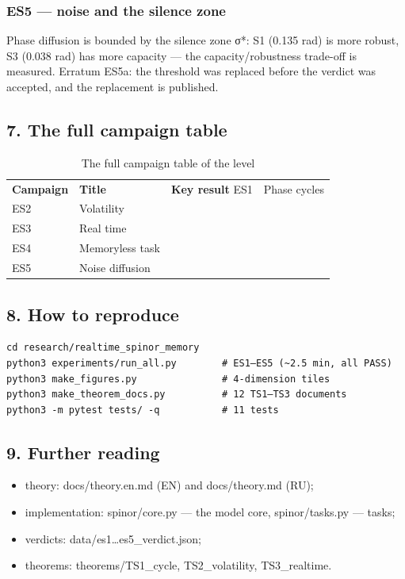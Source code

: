 \documentclass[11pt,a4paper]{article}
\begin{document}
\subsubsection{ES5 — noise and the silence zone}

Phase diffusion is bounded by the silence zone σ*: S1 (0.135 rad) is more robust, S3 (0.038 rad) has more capacity — the capacity/robustness trade-off is measured. Erratum ES5a: the threshold was replaced before the verdict was accepted, and the replacement is published.

\subsection{7. The full campaign table}

\begin{table}[htbp]\centering\small
\caption{The full campaign table of the level}
\begin{tabular}{p{} p{} p{}}
\toprule
\textbf{Campaign} & \textbf{Title} & \textbf{Key result}
\midrule
ES1 & Phase cycles &  \\
ES2 & Volatility &  \\
ES3 & Real time &  \\
ES4 & Memoryless task &  \\
ES5 & Noise diffusion &  \\
\bottomrule
\end{tabular}
\end{table}

\subsection{8. How to reproduce}

\begin{verbatim}
cd research/realtime_spinor_memory
python3 experiments/run_all.py        # ES1–ES5 (~2.5 min, all PASS)
python3 make_figures.py               # 4-dimension tiles
python3 make_theorem_docs.py          # 12 TS1–TS3 documents
python3 -m pytest tests/ -q           # 11 tests
\end{verbatim}

\subsection{9. Further reading}

\begin{itemize}
  \item theory: docs/theory.en.md (EN) and docs/theory.md (RU);
  \item implementation: spinor/core.py — the model core, spinor/tasks.py — tasks;
  \item verdicts: data/es1…es5\_verdict.json;
  \item theorems: theorems/TS1\_cycle, TS2\_volatility, TS3\_realtime.
\end{itemize}
\end{document}
